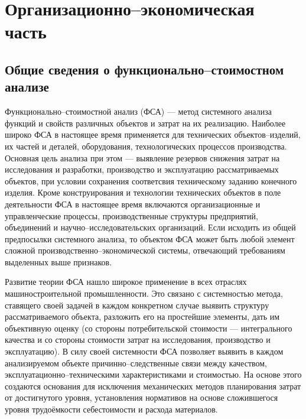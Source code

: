\newpage
\section{Организационно--экономическая часть}

\subsection{Общие сведения о функционально--стоимостном анализе}
Функционально--стоимостной анализ (ФСА) --- метод системного
анализа функций и свойств различных объектов и затрат на их
реализацию.
Наиболее широко ФСА в настоящее время применяется для технических
объектов--изделий, их частей и деталей, оборудования, технологических процессов
производства.
Основная цель анализа при этом --- выявление резервов снижения затрат на
исследования и разработки, производство и эксплуатацию рассматриваемых объектов,
при условии сохранения соответсвия техническому заданию конечного изделия.
Кроме конструирования и технологии технических объектов в поле деятельности ФСА
в настоящее время включаются организационные и управленческие процессы,
производственные структуры предприятий, объединений и научно--исследовательских
организаций.
Если исходить из общей предпосылки системного анализа, то объектом ФСА может
быть любой элемент сложной производственно--экономической системы, отвечающий
требованиям выделенных выше признаков.


Развитие теории ФСА нашло широкое применение в всех отраслях машиностроительной
промышленности.
Это связано с системностью метода, ставящего своей задачей в каждом конкретном
случае выявить структуру рассматриваемого объекта, разложить его на простейшие
элементы, дать им объективную оценку (со стороны потребительской стоимости ---
интегрального качества и со стороны стоимости затрат на исследования,
производство и эксплуатацию).
В силу своей системности ФСА позволяет выявить в каждом анализируемом объекте
причинно--следственные связи между качеством, эксплуатационно--техническими
характеристиками и стоимостью.
На основе этого создаются основания для исключения механических методов
планирования затрат от достигнутого уровня, установления нормативов на основе
сложившегося уровня трудоёмкости себестоимости и расхода материалов.



